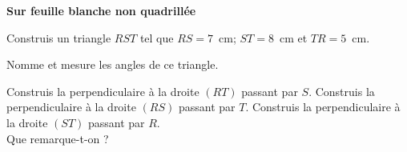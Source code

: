 {\bf Sur feuille blanche non quadrillée}
\begin{myenumerate}
\item Construis un triangle $RST$ tel que $RS=7$~cm; $ST=8$~cm et
$TR=5$~cm.
\item Nomme et mesure les angles de ce triangle.
\item Construis la perpendiculaire à la droite $(RT)$ passant par
$S$. Construis la perpendiculaire à la droite $(RS)$ passant par
$T$. Construis la perpendiculaire à la droite $(ST)$ passant par
$R$.\\Que remarque-t-on ?
\end{myenumerate}